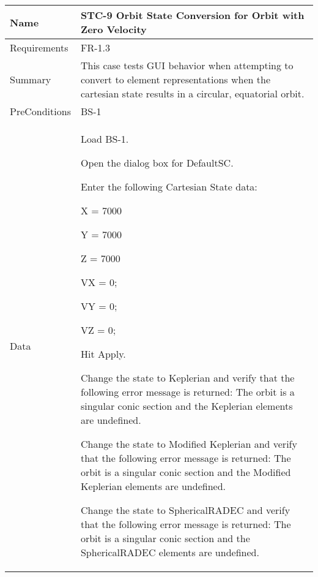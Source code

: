


\begin{table}[htbp!]
\centering
      \begin{tabular}{|p{1.05 in} |p{4.75 in} |}
      \hline
         \rowcolor[rgb]{0.8,0.8,0.8} Name & STC-9 Orbit State Conversion for Orbit with Zero Velocity\\
         \hline
         Requirements & FR-1.3\\  \hline
         Summary &
         This  case tests GUI behavior when attempting to convert to element representations when the
         cartesian state results in a circular, equatorial orbit.
         \\     \hline
         PreConditions & BS-1\\     \hline
         Data &
         \begin{compactenum}
             \item Load BS-1.
             \item Open the dialog box for DefaultSC.
             \item Enter the following Cartesian State data:
                      \begin{compactenum}
                         \item X = 7000
                         \item Y = 7000
                         \item Z = 7000
                         \item VX = 0;
                         \item VY = 0;
                         \item VZ = 0;
                      \end{compactenum}
             \item Hit Apply.
             \item Change the state to Keplerian and verify that the following error message is returned: The orbit is a singular conic section and the Keplerian elements are undefined.
             \item Change the state to Modified Keplerian and verify that the following error message is returned: The orbit is a singular conic section and the Modified Keplerian elements are undefined.
             \item Change the state to SphericalRADEC and verify that the following error message is returned: The orbit is a singular conic section and the SphericalRADEC elements are undefined.

\end{compactenum}
\end{tabular}
\end{table}
